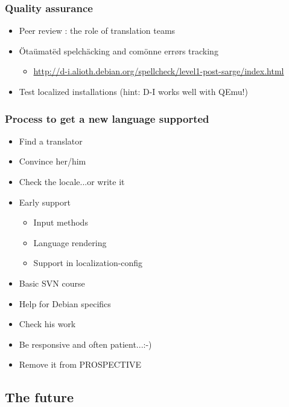 \documentclass{beamer}
\begin{document}
\begin{frame}
  \frametitle{Quality assurance}
	\begin{itemize}
	\item
		Peer review : the role of translation teams
	\item
		Ötaümatëd spelchäcking and comönne errørs tracking
		\begin{itemize}
			\item
				\url{http://d-i.alioth.debian.org/spellcheck/level1-post-sarge/index.html}
		\end{itemize}
	\item
		Test localized installations (hint: D-I works well with QEmu!)
	\end{itemize}

\end{frame}

\begin{frame}
  \frametitle{Process to get a new language supported}

	\begin{itemize}
	\item
		Find a translator
	\item
		Convince her/him
	\item
		Check the locale...or write it
	\item
		Early support
		\begin{itemize}
			\item
				Input methods
			\item
				Language rendering
			\item
				Support in localization-config
		\end{itemize}
	\item
		Basic SVN course
	\item
		Help for Debian specifics
	\item
		Check his work
	\item
		Be responsive and often patient...:-)
	\item
		Remove it from PROSPECTIVE
	\end{itemize}

\end{frame}

\subsection{The future}
\end{document}
